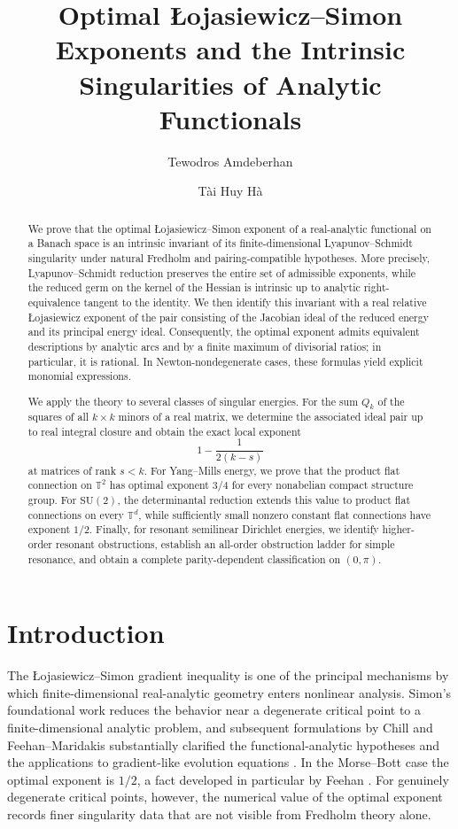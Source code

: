 \documentclass[11pt]{article}
\title{Optimal \L{}ojasiewicz–Simon Exponents and the Intrinsic Singularities of Analytic Functionals}
\author[1]{Tewodros Amdeberhan}
\author[1]{T\`ai Huy H\`a}
\affil[1]{Tulane University, Department of Mathematics,}
\affil[ ]{6823 St. Charles Avenue, New Orleans LA 70118, USA}
\affil[ ]{\texttt{tamdeber@tulane.edu} and \texttt{tha@tulane.edu}}
\date{}
\theoremstyle{definition}
\theoremstyle{remark}
\begin{document}
\maketitle

\begin{abstract} 
We prove that the optimal \L{}ojasiewicz--Simon exponent of a real-analytic functional on a Banach space is an intrinsic invariant of its finite-dimensional Lyapunov--Schmidt singularity under natural Fredholm and pairing-compatible hypotheses. More precisely, Lyapunov--Schmidt reduction preserves the entire set of admissible exponents, while the reduced germ on the kernel of the Hessian is intrinsic up to analytic right-equivalence tangent to the identity. We then identify this invariant with a real relative Łojasiewicz exponent of the pair consisting of the Jacobian ideal of the reduced energy and its principal energy ideal. Consequently, the optimal exponent admits equivalent descriptions by analytic arcs and by a finite maximum of divisorial ratios; in particular, it is rational. In Newton-nondegenerate cases, these formulas yield explicit monomial expressions.

We apply the theory to several classes of singular energies. For the sum $Q_k$ of the squares of all $k\times k$ minors of a real matrix, we determine the associated ideal pair up to real integral closure and obtain the exact local exponent
$$1-\frac1{2(k-s)}$$
at matrices of rank $s<k$. For Yang--Mills energy, we prove that the product flat connection on $\mathbb T^2$ has optimal exponent $3/4$ for every nonabelian compact structure group. For $\mathrm{SU}(2)$, the determinantal reduction extends this value to product flat connections on every $\mathbb T^d$, while sufficiently small nonzero constant flat connections have exponent $1/2$. Finally, for resonant semilinear Dirichlet energies, we identify higher-order resonant obstructions, establish an all-order obstruction ladder for simple resonance, and obtain a complete parity-dependent classification on $(0,\pi)$.
\end{abstract}


\section{Introduction}

The \L{}ojasiewicz--Simon gradient inequality is one of the principal mechanisms by which finite-dimensional real-analytic geometry enters nonlinear analysis. Simon's foundational work \cite{Simon1983} reduces the behavior near a degenerate critical point to a finite-dimensional analytic problem, and subsequent formulations by Chill and Feehan--Maridakis substantially clarified the functional-analytic hypotheses and the applications to gradient-like evolution equations \cite{Chill2003,FeehanMaridakis2020,FeehanMaridakisMemoirs}. In the Morse--Bott case the optimal exponent is $1/2$, a fact developed in particular by Feehan \cite{Feehan2020,Feehan2022}. For genuinely degenerate critical points, however, the numerical value of the optimal exponent records finer singularity data that are not visible from Fredholm theory alone.
\end{document}
